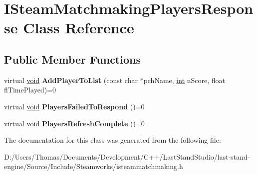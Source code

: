 \hypertarget{classISteamMatchmakingPlayersResponse}{}\section{I\+Steam\+Matchmaking\+Players\+Response Class Reference}
\label{classISteamMatchmakingPlayersResponse}
\subsection*{Public Member Functions}
\begin{DoxyCompactItemize}
\item 
\hypertarget{classISteamMatchmakingPlayersResponse_ab7b31c0c6c0cd9ec40cb58272791c13f}{}virtual \hyperlink{SDL__audio_8h_a52835ae37c4bb905b903cbaf5d04b05f}{void} {\bfseries Add\+Player\+To\+List} (const char $\ast$pch\+Name, \hyperlink{SDL__thread_8h_a6a64f9be4433e4de6e2f2f548cf3c08e}{int} n\+Score, float fl\+Time\+Played)=0\label{classISteamMatchmakingPlayersResponse_ab7b31c0c6c0cd9ec40cb58272791c13f}

\item 
\hypertarget{classISteamMatchmakingPlayersResponse_ab555af586e505182888b64fac9a11e66}{}virtual \hyperlink{SDL__audio_8h_a52835ae37c4bb905b903cbaf5d04b05f}{void} {\bfseries Players\+Failed\+To\+Respond} ()=0\label{classISteamMatchmakingPlayersResponse_ab555af586e505182888b64fac9a11e66}

\item 
\hypertarget{classISteamMatchmakingPlayersResponse_aa8382d0a999db8148929e43b564ece02}{}virtual \hyperlink{SDL__audio_8h_a52835ae37c4bb905b903cbaf5d04b05f}{void} {\bfseries Players\+Refresh\+Complete} ()=0\label{classISteamMatchmakingPlayersResponse_aa8382d0a999db8148929e43b564ece02}

\end{DoxyCompactItemize}


The documentation for this class was generated from the following file\+:\begin{DoxyCompactItemize}
\item 
D\+:/\+Users/\+Thomas/\+Documents/\+Development/\+C++/\+Last\+Stand\+Studio/last-\/stand-\/engine/\+Source/\+Include/\+Steamworks/isteammatchmaking.\+h\end{DoxyCompactItemize}
